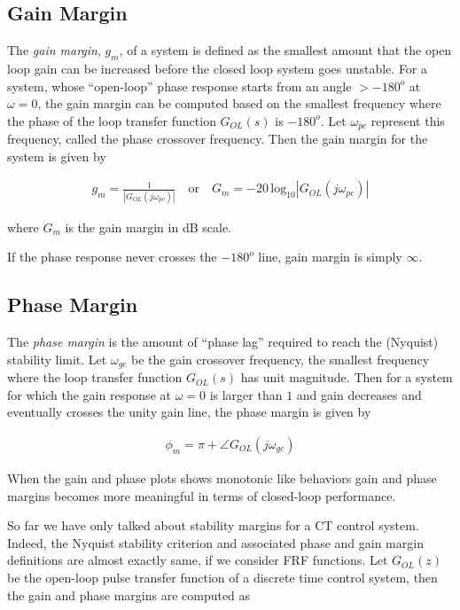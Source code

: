\documentclass[twoside]{article}
\begin{document}
\subsection*{Gain Margin}

The \textit{gain margin}, $g_m$, of a system is defined as the smallest amount
that the open loop gain can be increased before the closed loop system 
goes unstable. For a system, whose ``open-loop'' phase response starts from an angle
$> -180^o$ at $\omega = 0$, the gain margin can be computed based on 
the smallest frequency where the phase of the loop transfer function
$G_{OL}(s)$ is $-180^o$. Let $\omega_{pc}$ represent this frequency,
called the phase crossover frequency. Then the gain margin for the
system is given by

\begin{align*}
  g_m = \frac{1}{| G_{OL}(j \omega_{pc})| } \quad \mathrm{or} \quad G_m
  = -20 \,
  \mathrm{log}_{10} | G_{OL}(j \omega_{pc} ) |
\end{align*}

where $G_m$ is the gain margin in dB scale. 

If the phase response never crosses the $-180^o$ line, gain margin is simply $\infty$.

\subsection*{Phase Margin}

The \textit{phase margin} is the amount of ``phase lag'' required to
reach the (Nyquist) stability limit. Let $\omega_{gc}$ be the gain
crossover frequency, the smallest frequency where the loop transfer 
function $G_{OL}(s)$ has unit magnitude. Then for a system for which
the gain response at $\omega = 0$ is larger than $1$ and gain
decreases and eventually crosses the unity gain line, the phase margin 
is given by

\begin{align*}
  \phi_m = \pi + \angle G_{OL} (j \omega_{gc})
\end{align*}

When the gain and phase plots shows monotonic like 
behaviors gain and phase margins becomes more 
meaningful in terms of closed-loop performance.

So far we have only talked about stability margins for a
CT control system. Indeed, the Nyquist stability criterion 
and associated phase and gain margin definitions
are almost exactly same, if we consider FRF functions.
Let $G_{OL}(z)$ be the open-loop pulse transfer function
of a discrete time control system, then the gain and
phase margins are computed as
\end{document}
